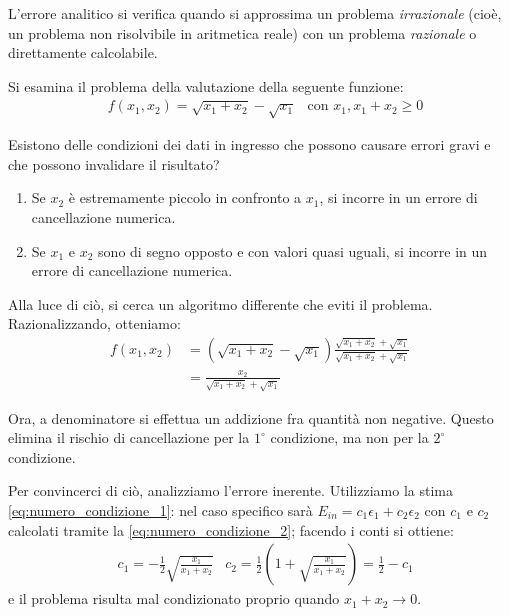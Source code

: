 \documentclass{article}
\begin{document}
L'errore analitico si verifica quando si approssima un problema
\emph{irrazionale} (cioè, un problema non risolvibile in aritmetica reale)
con un problema \emph{razionale} o direttamente calcolabile.
\begin{example}
    Si esamina il problema della valutazione della seguente funzione:
    \begin{equation*}
        \begin{aligned}
            & f(x_1,x_2)=\sqrt{x_1+x_2}-\sqrt{x_1} & \text{con }x_1
            ,x_1+x_2\geq 0
        \end{aligned}
    \end{equation*}

    Esistono delle condizioni dei dati in ingresso che possono causare errori
    gravi e che possono invalidare il risultato?

    \begin{enumerate}
        \item Se $x_2$ è estremamente piccolo in confronto a $x_1$, si
            incorre in un errore di cancellazione numerica.
        \item Se $x_1$ e $x_2$ sono di segno opposto e con valori quasi
            uguali, si incorre in un errore di cancellazione numerica.
    \end{enumerate}

    Alla luce di ciò, si  cerca un algoritmo differente che eviti il problema. 
    Razionalizzando, otteniamo: 
    \begin{equation*}
       \begin{aligned}
            f(x_1,x_2)&=(\sqrt{x_1+x_2}-\sqrt{x_1})\frac{\sqrt{x_1+x_2}+\sqrt{x_1}}{\sqrt{x_1+x_2}+\sqrt{x_1}}
            \\ 
                      &= \frac{x_2}{\sqrt{x_1+x_2}+\sqrt{x_1}}
       \end{aligned} 
    \end{equation*}

    Ora, a denominatore si effettua un addizione fra quantità non negative. 
    Questo elimina il rischio di cancellazione per la $1^{\circ}$ condizione,
    ma non per la $2^{\circ}$ condizione. 

    Per convincerci di ciò, analizziamo l'errore inerente. 
    Utilizziamo la stima \ref{eq:numero_condizione_1}: 
    nel caso specifico sarà $E_{in}=c_1\epsilon_1+c_2\epsilon_2$ con $c_1$ e $c_2$
    calcolati tramite la \ref{eq:numero_condizione_2}; facendo i conti si
    ottiene:
    \begin{equation*}
       \begin{aligned}
           & c_1=-\frac{1}{2}\sqrt{\frac{x_1}{x_1+x_2}} &
           c_2=\frac{1}{2}(1+\sqrt{\frac{x_1}{x_1+x_2}})=\frac{1}{2}-c_1
       \end{aligned} 
    \end{equation*}
    e il problema risulta mal condizionato proprio quando $x_1+x_2\rightarrow
    0$.


\end{example}
\end{document}
